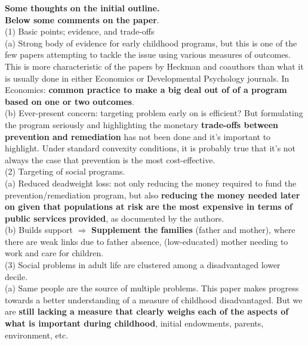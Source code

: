 



\doublespacing

\noindent \textbf{Some thoughts on the initial outline.}\\
\noindent \textbf{Below some comments on the paper}.\\

\noindent (1) Basic points; evidence, and trade-offs \\ 

\noindent (a) Strong body of evidence for early childhood programs, but this is one of the few papers attempting to tackle the issue using various measures of outcomes. This is more characteristic of the papers by Heckman and coauthors than what it is usually done in either Economics or Developmental Psychology journals. In Economics: \textbf{common practice to make a big deal out of of a program based on one or two outcomes}.\\

\noindent (b) Ever-present concern: targeting problem early on is efficient? But formulating the program seriously and highlighting the monetary \textbf{trade-offs between prevention and remediation} has not been done and it's important to highlight. Under standard convexity conditions, it is probably true that it's not always the case that prevention is the most cost-effective.\\

\noindent (2) Targeting of social programs.\\ 

\noindent (a) Reduced deadweight loss: not only reducing the money required to fund the prevention/remediation program, but also \textbf{reducing the money needed later on given that populations at risk are the most expensive in terms of public services provided}, as documented by the authors.\\

\noindent (b) Builds support $\Rightarrow$ \textbf{Supplement the families} (father and mother), where there are weak links due to father absence, (low-educated) mother needing to work and care for children.\\ 

\noindent (3) Social problems in adult life are clustered among a disadvantaged lower decile.\\

\noindent (a) Same people are the source of multiple problems. This paper makes progress towards a better understanding of a measure of childhood disadvantaged. But we are \textbf{still lacking a measure that clearly weighs each of the aspects of what is important during childhood}, initial endowments, parents, environment, etc.\\

